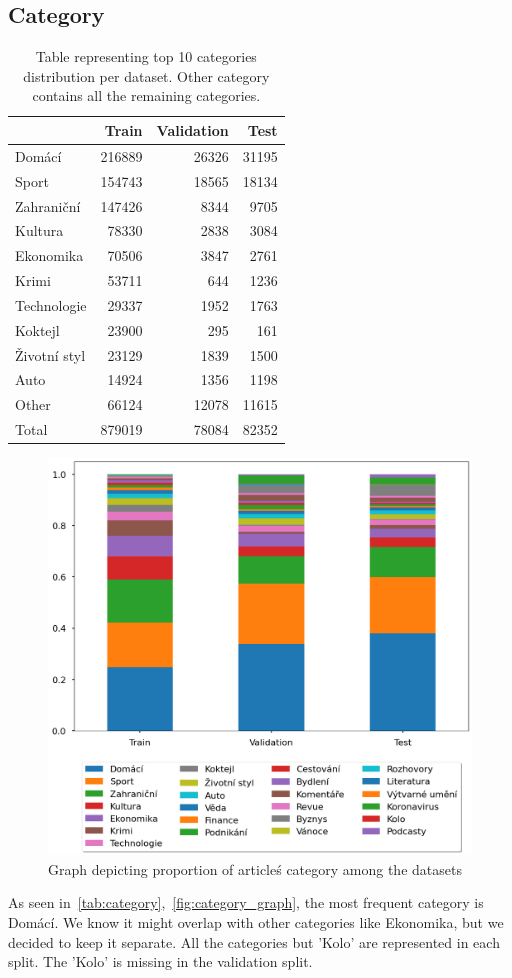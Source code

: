 \subsection{Category}
\begin{table}[h]
    \centering\footnotesize\sf
    \begin{tabular}{lrrr}
        \toprule
        {}           & Train  & Validation & Test  \\
        \midrule
        Domácí       & 216889 & 26326      & 31195 \\
        Sport        & 154743 & 18565      & 18134 \\
        Zahraniční   & 147426 & 8344       & 9705  \\
        Kultura      & 78330  & 2838       & 3084  \\
        Ekonomika    & 70506  & 3847       & 2761  \\
        Krimi        & 53711  & 644        & 1236  \\
        Technologie  & 29337  & 1952       & 1763  \\
        Koktejl      & 23900  & 295        & 161   \\
        Životní styl & 23129  & 1839       & 1500  \\
        Auto         & 14924  & 1356       & 1198  \\
        \midrule
        Other        & 66124  & 12078      & 11615 \\
        \midrule
        Total        & 879019 & 78084      & 82352 \\
        \bottomrule
    \end{tabular}
    \caption{Table representing top 10 categories distribution per dataset. Other category contains all the remaining categories.}
    \label{tab:category}
\end{table}
\begin{figure}[h]
    \centering
    \includegraphics[width=.6\linewidth]{img/tasks_graph/category.png}
    \caption{Graph depicting proportion of article\'s category among the datasets}
    \label{fig:category_graph}
\end{figure}
As seen in~\autoref{tab:category},~\autoref{fig:category_graph}, the most frequent category is Domácí.
We know it might overlap with other categories like Ekonomika, but we decided to keep it separate.
All the categories but 'Kolo' are represented in each split. The 'Kolo' is missing in the validation split.

